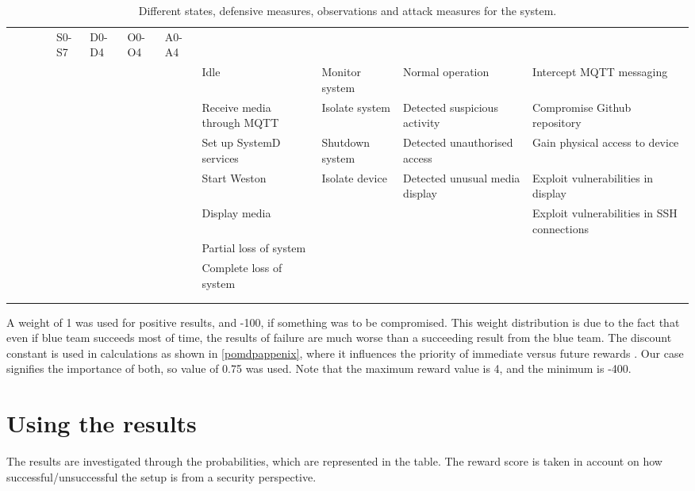 \begin{landscape}
\begin{table}
\centering
\begin{tabular}{ |c|c|c|c| }
 \hline & & & & S0-S7 & D0-D4 & O0-O4 & A0-A4 \\ & & & & \hline \hline
 & & & & Idle & Monitor system & Normal operation & Intercept MQTT
 messaging \\ & & & & \hline & & & & Receive media through MQTT &
 Isolate system & Detected suspicious activity & Compromise Github
 repository \\ & & & & \hline & & & & Set up SystemD services &
 Shutdown system & Detected unauthorised access & Gain physical access to
 device \\ & & & & \hline & & & & Start Weston & Isolate device &
 Detected unusual media display & Exploit vulnerabilities in display
 \\ & & & & \hline & & & & Display media & & & Exploit vulnerabilities
 in SSH connections \\ & & & & \hline & & & & Partial loss of system & \ & \ &
 \\ & & & & \hline & & & & Complete loss of system & & & \\ & & & &
 \hline & & & & & & & \\ & & & & \hline

\end{tabular}
\caption{Different states, defensive measures, observations and attack
  measures for the system.}
\label{pomdbtable}
\end{table}
\end{landscape}

A weight of 1 was used for positive results, and -100, if something
was to be compromised. This weight distribution is due to the fact
that even if blue team succeeds most of time, the results of failure
are much worse than a succeeding result from the blue team. The
discount constant is used in calculations as shown in
\ref{pomdpappenix}, where it influences the priority of immediate
versus future rewards \cite{mcabeeMarkov}. Our case signifies the
importance of both, so value of 0.75 was used. Note that the maximum
reward value is 4, and the minimum is -400.

\section{Using the results} \label{usingtheresults}

The results are investigated through the probabilities, which are
represented in the table. The reward score is taken in account on how
successful/unsuccessful the setup is from a security perspective.


